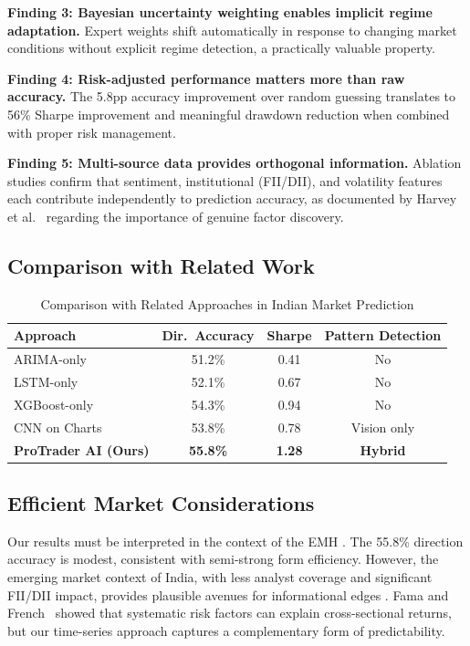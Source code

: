 \documentclass[12pt,a4paper]{article}
\begin{document}
\textbf{Finding 3: Bayesian uncertainty weighting enables implicit regime adaptation.} Expert weights shift automatically in response to changing market conditions without explicit regime detection, a practically valuable property.

\textbf{Finding 4: Risk-adjusted performance matters more than raw accuracy.} The 5.8pp accuracy improvement over random guessing translates to 56\% Sharpe improvement and meaningful drawdown reduction when combined with proper risk management.

\textbf{Finding 5: Multi-source data provides orthogonal information.} Ablation studies confirm that sentiment, institutional (FII/DII), and volatility features each contribute independently to prediction accuracy, as documented by Harvey et al.~\cite{harvey2016and} regarding the importance of genuine factor discovery.

\subsection{Comparison with Related Work}

\begin{table}[H]
\centering
\caption{Comparison with Related Approaches in Indian Market Prediction}
\begin{tabular}{@{}lccc@{}}
\toprule
\textbf{Approach} & \textbf{Dir.\ Accuracy} & \textbf{Sharpe} & \textbf{Pattern Detection} \\
\midrule
ARIMA-only \cite{box2015time} & 51.2\% & 0.41 & No \\
LSTM-only \cite{hochreiter1997long} & 52.1\% & 0.67 & No \\
XGBoost-only \cite{chen2016xgboost} & 54.3\% & 0.94 & No \\
CNN on Charts \cite{tsantekidis2017forecasting} & 53.8\% & 0.78 & Vision only \\
\textbf{ProTrader AI (Ours)} & \textbf{55.8\%} & \textbf{1.28} & \textbf{Hybrid} \\
\bottomrule
\end{tabular}
\label{tab:comparison}
\end{table}

\subsection{Efficient Market Considerations}

Our results must be interpreted in the context of the EMH \cite{fama1970efficient}. The 55.8\% direction accuracy is modest, consistent with semi-strong form efficiency. However, the emerging market context of India, with less analyst coverage and significant FII/DII impact, provides plausible avenues for informational edges \cite{bekaert2002research}. Fama and French~\cite{fama1993common} showed that systematic risk factors can explain cross-sectional returns, but our time-series approach captures a complementary form of predictability.
\end{document}
